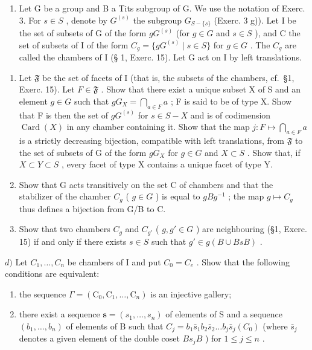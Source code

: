 \begin{enumerate}
\def\labelenumi{\arabic{enumi})}
\setcounter{enumi}{9}
\tightlist
\item
  Let G be a group and B a Tits subgroup of G. We use the notation of Exerc. 3. For \(s \in S\) , denote by \(G^{(s)}\) the subgroup \(G_{S - \{s\}}\) (Exerc. 3 g)). Let I be the set of subsets of G of the form \(gG^{(s)}\) (for \(g \in G\) and \(s \in S\) ), and C the set of subsets of I of the form \(C_g = \{gG^{(s)} \mid s \in S\}\) for \(g \in G\) . The \(C_g\) are called the chambers of I (§ 1, Exerc. 15). Let G act on I by left translations.
\end{enumerate}

\begin{enumerate}
\def\labelenumi{\alph{enumi})}
\item
  Let \(\mathfrak{F}\) be the set of facets of I (that is, the subsets of the chambers, cf.~§1, Exerc. 15). Let \(F \in \mathfrak{F}\) . Show that there exist a unique subset X of S and an element \(g \in G\) such that \(gG_{X} = \bigcap_{a \in F} a\) ; F is said to be of type X. Show that F is then the set of \(gG^{(s)}\) for \(s \in S - X\) and is of codimension \(\operatorname{Card}(X)\) in any chamber containing it. Show that the map \(j: F \mapsto \bigcap_{a \in F} a\) is a strictly decreasing bijection, compatible with left translations, from \(\mathfrak{F}\) to the set of subsets of G of the form \(gG_{X}\) for \(g \in G\) and \(X \subset S\) . Show that, if \(X \subset Y \subset S\) , every facet of type X contains a unique facet of type Y.
\item
  Show that G acts transitively on the set C of chambers and that the stabilizer of the chamber \(C_{g}\) ( \(g \in G\) ) is equal to \(gBg^{-1}\) ; the map \(g \mapsto C_{g}\) thus defines a bijection from G/B to C.
\item
  Show that two chambers \(C_{g}\) and \(C_{g'}\) ( \(g, g' \in G\) ) are neighbouring (§1, Exerc. 15) if and only if there exists \(s \in S\) such that \(g' \in g(B \cup BsB)\) .
\end{enumerate}

\(d)\) Let \(C_1, \ldots, C_n\) be chambers of I and put \(C_0 = C_e\) . Show that the following conditions are equivalent:

\begin{enumerate}
\def\labelenumi{(\roman{enumi})}
\item
  the sequence \(\Gamma = (\mathrm{C}_0, \mathrm{C}_1, \ldots, \mathrm{C}_n)\) is an injective gallery;
\item
  there exist a sequence \(\mathbf{s} = (s_1, \ldots, s_n)\) of elements of S and a sequence \((b_1, \ldots, b_n)\) of elements of B such that \(C_j = b_1 \bar{s}_1 b_2 \bar{s}_2 \ldots b_j \bar{s}_j (C_0)\) (where \(\bar{s}_j\) denotes a given element of the double coset \(Bs_jB\) ) for \(1 \leqslant j \leqslant n\) .
\end{enumerate}

